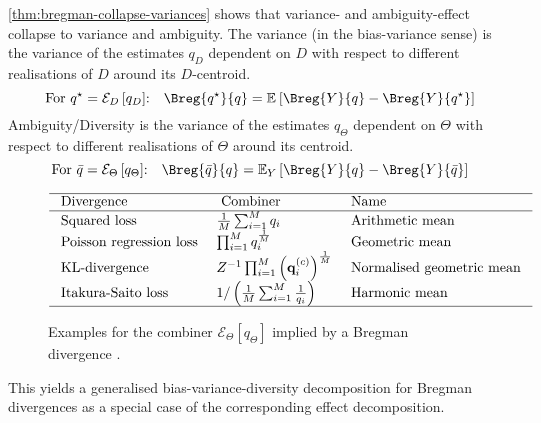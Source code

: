 \documentclass[../main.tex]{subfiles}
\begin{document}

\cref{thm:bregman-collapse-variances} shows that variance- and ambiguity-effect collapse to variance and ambiguity. The variance (in the bias-variance sense) is the variance of the estimates $q_D$ dependent on $D$ with respect to different realisations of $D$ around its $D$-centroid. 
$$
\text{For $q^\star = \mathcal{E}_D\left[q_D\right]$:}\hspace{1em}
\Breg{q^\star}{q} = \mathbb{E}_{}\left[ \Breg{Y}{q} - \Breg{Y}{q^\star} \right]
$$
Ambiguity/Diversity is the variance of the estimates $q_\Theta$ dependent on $\Theta$ with respect to different realisations of $\Theta$ around its centroid.
$$
\text{For $\bar{q} = \mathcal{E}_\Theta\left[q_\Theta\right]$:}\hspace{1em}
\Breg{\bar{q}}{q} = \mathbb{E}_{Y}\left[ \Breg{Y}{q} - \Breg{Y}{\bar{q}} \right]
$$

\begin{figure}
$$
\begin{array}{lll}
\hline \text { Divergence } & \text { Combiner } & \text { Name } \\
\hline \text { Squared loss } & \frac{1}{M} \sum_{i=1}^M q_i & \text { Arithmetic mean } \\
\text { Poisson regression loss } & \prod_{i=1}^M q_i^{\frac{1}{M}} & \text { Geometric mean } \\
\text { KL-divergence } & Z^{-1} \prod_{i=1}^M\left(\mathbf{q}_i^{(c)}\right)^{\frac{1}{M}} & \text { Normalised geometric mean } \\
\text { Itakura-Saito loss } & 1 /\left(\frac{1}{M} \sum_{i=1}^M \frac{1}{q_i}\right) & \text { Harmonic mean } \\
\hline
\end{array}
$$
\caption{Examples for the combiner $\mathcal{E}_\Theta \left[q_\Theta\right]$ implied by a Bregman divergence \cite{wood_UnifiedTheoryDiversity_2023}.}
\end{figure}

This yields a generalised bias-variance-diversity decomposition for Bregman divergences as a special case of the corresponding effect decomposition.
\end{document}
